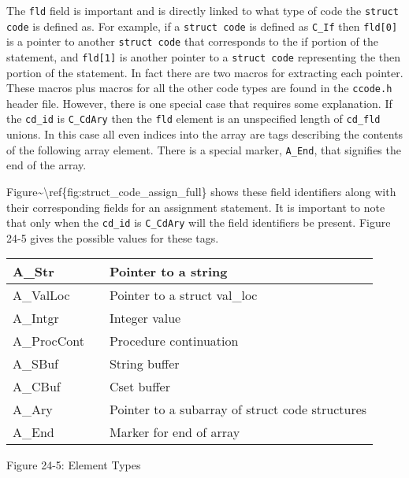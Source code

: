 The \texttt{fld} field is important and is directly linked to what
type of code the \texttt{struct code} is defined as.  For example, if
a \texttt{struct code} is defined as \texttt{C\_If} then
\texttt{fld[0]} is a pointer to another \texttt{struct code} that
corresponds to the if portion of the statement, and \texttt{fld[1]} is
another pointer to a \texttt{struct code} representing the then
portion of the statement. In fact there are two macros for extracting
each pointer. These macros plus macros for all the other code types
are found in the \texttt{ccode.h} header file. However, there is one
special case that requires some explanation. If the \texttt{cd\_id} is
\texttt{C\_CdAry} then the \texttt{fld} element is an unspecified
length of \texttt{cd\_fld} unions. In this case all even indices into
the array are tags describing the contents of the following array
element. There is a special marker, \texttt{A\_End}, that signifies
the end of the array.

Figure{\color{red}\~{}{\textbackslash}ref\{fig:struct\_code\_assign\_full\}} shows
these field identifiers along with their corresponding fields for an
assignment statement. It is important to note that only when the
\texttt{cd\_id} is \texttt{C\_CdAry} will the field identifiers be
present. Figure 24-5 gives the possible values for these tags.

\begin{center}
\tabletail{}
\tablelasttail{}
\begin{xtabular}{|m{0.93935984in}|m{0.41775984in}|m{3.12266in}|}
\hline
 A\_Str &
 &
 Pointer to a string\\\hline
 A\_ValLoc &
 &
 Pointer to a struct val\_loc\\\hline
 A\_Intgr &
 &
 Integer value\\\hline
 A\_ProcCont &
 &
 Procedure continuation\\\hline
 A\_SBuf &
 &
 String buffer\\\hline
 A\_CBuf &
 &
 Cset buffer\\\hline
 A\_Ary &
 &
 Pointer to a subarray of struct code structures\\\hline
 A\_End &
 &
 Marker for end of array\\\hline
\end{xtabular}
\end{center}
{\centering{}
Figure 24-5: Element Types
\par}

